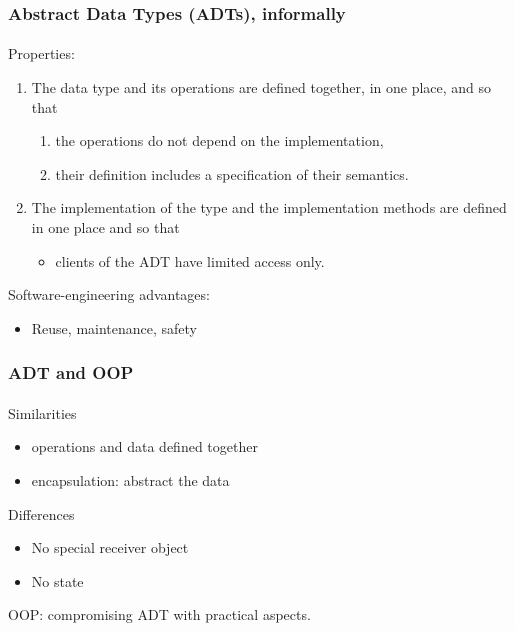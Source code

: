 \documentclass{beamer}
\begin{document}
\begin{frame}[fragile]
\frametitle{Abstract Data Types (ADTs), informally}
\framesubtitle{}
Properties: 

\begin{enumerate}
\item The data type and its operations are defined 
together, in one place, and so that
\begin{enumerate}
\item the operations do not depend on the implementation,
\item their definition includes a specification of their semantics.
\end{enumerate}
\item The implementation of the type and the implementation methods
are defined in one place and so that 
\begin{itemize}
\item clients of the ADT have
limited access only. 
\end{itemize}
\end{enumerate}
\bigskip

Software-engineering advantages:
\begin{itemize}
\item Reuse, maintenance, safety %
\end{itemize}
\end{frame}

\begin{frame}
\frametitle{ADT and OOP}
\framesubtitle{}

Similarities
\begin{itemize}
  \item operations and data defined together
  \item encapsulation: abstract the data
\end{itemize}

Differences
\begin{itemize}
  \item No special receiver object
  \item No state
\end{itemize}

\bigskip

OOP: compromising ADT with practical aspects.

\end{frame}
\end{document}
